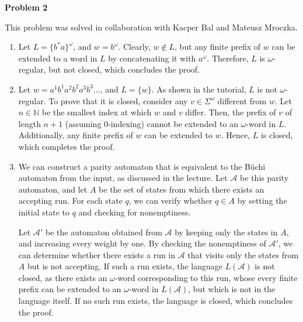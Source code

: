 \documentclass[12pt]{article}
\begin{document}
	\bigskip
	
	\textbf{Problem 2}
	
	\medskip
	
	This problem was solved in collaboration with Kacper Bal and Mateusz
	Mroczka.
	
	\begin{enumerate}
		\item Let \(L = \{b^{\ast} a\}^{\omega}\), and \(w = b^{\omega}\).
		      Clearly, \(w \notin L\), but any finite prefix of \(w\) can be
		      extended to a word in \(L\) by concatenating it with
		      \(a^{\omega}\). Therefore, \(L\) is \(\omega\)-regular, but not
		      closed, which concludes the proof.
		
		\item Let \(w = a^{1} b^{1} a^{2} b^{2} a^{3} b^{3} \ldots\), and \(L =
		      \{w\}\). As shown in the tutorial, \(L\) is not
		      \(\omega\)-regular. To prove that it is closed, consider any \(v
		      \in \Sigma^{\omega}\) different from \(w\). Let \(n \in
		      \mathbb{N}\) be the smallest index at which \(w\) and \(v\)
		      differ. Then, the prefix of \(v\) of length \(n + 1\) (assuming
		      \(0\)-indexing) cannot be extended to an \(\omega\)-word in \(L\).
		      Additionally, any finite prefix of \(w\) can be extended to \(w\).
		      Hence, \(L\) is closed, which completes the proof.
		
		\item We can construct a parity automaton that is equivalent to the
		      Büchi automaton from the input, as discussed in the lecture. Let
		      \(\mathcal{A}\) be this parity automaton, and let \(A\) be the set
		      of states from which there exists an accepting run. For each state
		      \(q\), we can verify whether \(q \in A\) by setting the initial
		      state to \(q\) and checking for nonemptiness.
		      
		      Let \(\mathcal{A}'\) be the automaton obtained from
		      \(\mathcal{A}\) by keeping only the states in \(A\), and
		      increasing every weight by one. By checking the nonemptiness of
		      \(\mathcal{A}'\), we can determine whether there exists a run in
		      \(\mathcal{A}\) that visits only the states from \(A\) but is not
		      accepting. If such a run exists, the language \(L(\mathcal{A})\)
		      is not closed, as there exists an \(\omega\)-word corresponding to
		      this run, whose every finite prefix can be extended to an
		      \(\omega\)-word in \(L(\mathcal{A})\), but which is not in the
		      language itself. If no such run exists, the language is closed,
		      which concludes the proof.
	\end{enumerate}
\end{document}

